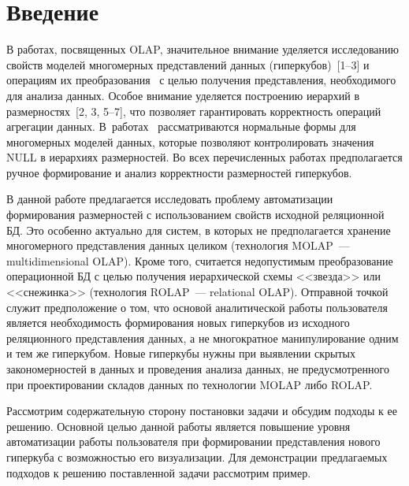       \begin{multicols}{2}

            \label{st\stat}
  
\section{Введение}
  
  В работах, посвященных OLAP, значительное внимание уделяется 
исследованию свойств моделей многомерных представлений данных 
(гиперкубов)~[1--3] и операциям их преобразования~\cite{2-z, 4-z} с целью 
получения представления, необходимого для анализа данных. Особое внимание 
уделяется построению иерархий в размерностях~[2, 3, 5--7], %
что  позволяет гарантировать корректность операций агрегации данных. 
В~работах~\cite{3-z, 5-z, 7-z} рас\-смат\-ри\-ва\-ют\-ся нормальные формы для 
многомерных моделей данных, которые позволяют контролировать значения 
NULL в иерархиях размерностей. Во всех перечисленных работах 
предполагается ручное формирование и анализ корректности размерностей 
гиперкубов.
  
  В данной работе предлагается исследовать проб\-ле\-му автоматизации 
формирования размерностей с использованием свойств исходной реляционной 
БД. Это особенно актуально для сис\-тем, в которых не 
предполагается хранение многомерного пред\-став\-ле\-ния данных целиком 
(технология \mbox{MOLAP}~--- multidimensional \mbox{OLAP}). 
Кроме того, считается недопустимым преобразование 
операционной БД с целью получения иерархической схемы <<звезда>> или 
<<снежинка>> (технология \mbox{ROLAP}~--- relational \mbox{OLAP}). Отправной точкой служит предположение 
о том, что основой аналитической работы пользователя является 
необходимость формирования новых гиперкубов из исходного реляционного 
пред\-став\-ле\-ния данных, а не многократное манипулирование одним и тем же 
гиперкубом. Новые гиперкубы нужны при выявлении скрытых 
закономерностей в данных и проведения анализа данных, не предусмотренного 
при проектировании складов данных по технологии \mbox{MOLAP} либо \mbox{ROLAP}.
  
  Рассмотрим содержательную сторону постановки задачи и обсудим подходы 
к ее решению. Основной целью данной работы является повышение уровня 
автоматизации работы пользователя при формировании представления нового 
гиперкуба с возможностью его визуализации. Для демонстрации предлагаемых 
подходов к решению поставленной задачи рассмотрим пример.

\begin{table*}\small
\begin{center}
\vspace*{2ex}


\end{center}
\end{table*}
\end{multicols}
